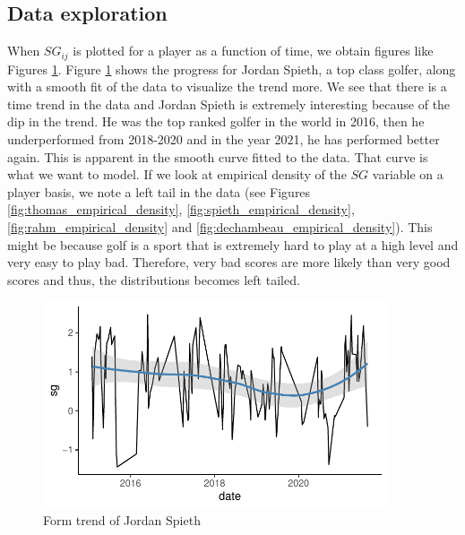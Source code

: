 \documentclass{article}\usepackage[]{graphicx}\usepackage[]{color}
\begin{document}
\subsection{Data exploration}
When $SG_{ij}$ is plotted for a player as a function of time, we obtain figures like Figures \ref{fig:spieth_progress}. Figure \ref{fig:spieth_progress} shows the progress for Jordan Spieth, a top class golfer, along with a smooth fit of the data to visualize the trend more. We see that there is a time trend in the data and Jordan Spieth is extremely interesting because of the dip in the trend. He was the top ranked golfer in the world in 2016, then he underperformed from 2018-2020 and in the year 2021, he has performed better again. This is apparent in the smooth curve fitted to the data. That curve is what we want to model. If we look at empirical density of the $SG$ variable on a player basis, we note a left tail in the data (see Figures \ref{fig:thomas_empirical_density}, \ref{fig:spieth_empirical_density}, \ref{fig:rahm_empirical_density} and \ref{fig:dechambeau_empirical_density}). This might be because golf is a sport that is extremely hard to play at a high level and very easy to play bad. Therefore, very bad scores are more likely than very good scores and thus, the distributions becomes left tailed.

\begin{figure}[h]
    \centering
    \includegraphics[width=4in]{Figures/progress_trend_spieth.pdf}
    \caption{Form trend of Jordan Spieth}
    \label{fig:spieth_progress}
\end{figure}
\end{document}
